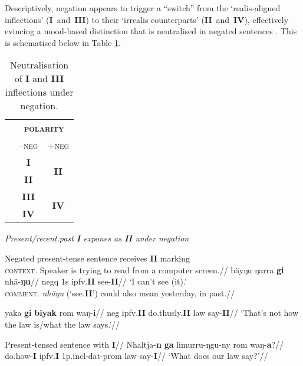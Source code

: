 Descriptively, negation appears to trigger a ``switch'' from the `realis-aligned inflections' (\textbf{I}~and~\textbf{III}) to their `irrealis counterparts' (\textbf{II}~and~\textbf{IV}), effectively evincing a mood-based distinction that is neutralised in negated sentences \citep[following ][356]{Wilkinson1991}. This is schematised below in Table \ref{negneut}.

\begin{table}[h]\centering
	\begin{tabular}{ccc}
		&\multicolumn{2}{c}{\textsc{\textbf{polarity}}} \\
		& \textsc{--neg} & \textsc{+neg}\\\midrule
	&	\textbf{I} & \multirow{2}{*}{\textbf{II}}\\
	& \textbf{II} \\\midrule
	&	\textbf{III} & \multirow{2}{*}{\textbf{IV}}\\
	& \textbf{IV} \\\bottomrule
	\end{tabular}
\caption{Neutralisation of \textbf{I} and \textbf{III} inflections under negation.}\label{negneut}
\end{table}


\pex\textit{Present/recent.past \textbf{I} expones as \textbf{II} under negation}\label{neg-pres}


\a\begingl\glpreamble  Negated present-tense sentence receives \textbf{II} marking\\\textsc{context.} Speaker is trying to read from a computer screen.//
\gla bäyŋu ŋarra \textbf{gi} nhä-\textbf{ŋu}//
\glb \gls{negq} 1s \gls{ipfv}.\textbf{II} see-\textbf{II}//
\glft`I can't see (it).'\trailingcitation{[AW 2018030]}\\\textsc{comment.} \textit{nhäŋu} (`see.\textbf{II}') could also mean yesterday, in past.//\endgl

\a\begingl%
\gla yaka \textbf{gi} \textbf{biyak} rom waŋ-\textbf{i}//
\glb \gls{neg} \gls{ipfv}.\textbf{II} do.thusly.\textbf{II} law say-\textbf{II}//
\glft`That's not how the law is/what the law says.'//\endgl


\a\begingl\glpreamble Present-tensed sentence with \textbf{I}//
\gla Nhaltja-\textbf{n} \textbf{ga} limurru-ŋgu-ny rom waŋ-\textbf{a}?//
\glb do.how-\textbf{I} \gls{ipfv}.\textbf{I} 1p.\gls{incl}-\gls{dat}-\gls{prom} law say-\textbf{I}//
\glft`What does our law say?'//\endgl


